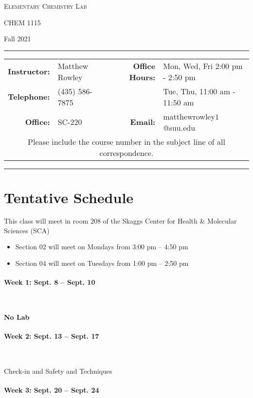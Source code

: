 \documentclass[12pt, letterpaper]{article}
\begin{document}
\begin{center}
	{\Large \textsc{Elementary Chemistry Lab}}
	
	CHEM 1115
\end{center}
\begin{center}
	{\large Fall 2021}
\end{center}
\begin{center}
	\rule{\textwidth}{0.4pt}
	\begin{tabular}{rlcrl}
		\textbf{Instructor:} & Matthew Rowley & & \textbf{Office Hours:} & Mon, Wed, Fri 2:00 pm - 2:50 pm \\
		\textbf{Telephone:} & (435) 586-7875 & & & Tue, Thu, 11:00 am - 11:50 am\\
		\textbf{Office:} & SC-220 & & \textbf{Email:} & matthewrowley$1$@suu.edu\\
		\multicolumn{5}{c}{Please include the course number in the subject line of all correspondence.} 
	\end{tabular}
	\rule{\textwidth}{0.4pt}
\end{center}

\section*{Tentative Schedule}
This class will meet in room 208 of the Skaggs Center for Health \& Molecular Sciences (SCA)
\begin{itemize}
	\item Section 02 will meet on Mondays from 3:00 pm – 4:50 pm
	\item Section 04 will meet on Tuesdays from 1:00 pm – 2:50 pm
\end{itemize}

\paragraph*{Week 1: Sept. 8 -- Sept. 10}~

\textbf{No Lab}

\paragraph{Week 2: Sept. 13 -- Sept. 17}~ 

Check-in and Safety and Techniques

\paragraph{Week 3: Sept. 20 -- Sept. 24}~
\end{document}
